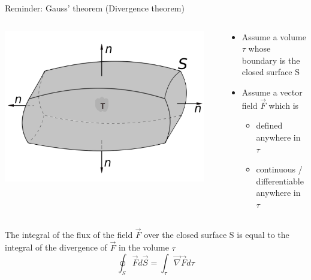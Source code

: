 {\begin{frame}{Reminder: Gauss' theorem (Divergence theorem)}
\begin{columns}
  \begin{column}{0.35\textwidth}
   \begin{center}
     \includegraphics[width=0.95\textwidth]{./images/schematics/divergence_theorem_tau.png}\\
   \end{center}
  \end{column}
  \begin{column}{0.65\textwidth}
     \begin{itemize}
       \item Assume a volume $\tau$ whose boundary is the closed surface S
       \item Assume a vector field $\vec{F}$ which is
        \begin{itemize}
           \item defined anywhere in $\tau$
           \item continuous / differentiable anywhere in $\tau$
        \end{itemize}
     \end{itemize}
  \end{column}
\end{columns}

 The integral of the flux of the field $\vec{F}$ over the closed surface S is
 equal to the integral of the divergence of $\vec{F}$ in the volume $\tau$\\
 \begin{equation*}
   \oint_{S} \vec{F} d\vec{S} = \int_{\tau} \vec{\nabla}\vec{F} d\tau
 \end{equation*}

\end{frame}

} %



